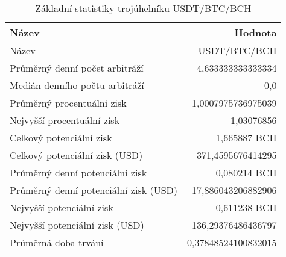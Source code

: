 \begin{table}\centering
\caption{Základní statistiky trojúhelníku USDT/BTC/BCH}
\label{USDTBTCBCH_stats}
\begin{tabular}{|| l | r ||}
\hline Název & Hodnota \\ 
\hline\hline Název & USDT/BTC/BCH \\ 
\hline Průměrný denní počet arbitráží & 4,633333333333334 \\ 
\hline Medián denního počtu arbitráží & 0,0 \\ 
\hline Průměrný procentuální zisk & 1,0007975736975039 \\ 
\hline Nejvyšší procentuální zisk & 1,03076856 \\ 
\hline Celkový potenciální zisk & 1,665887 BCH \\ 
\hline Celkový potenciální zisk (USD) & 371,4595676414295 \\ 
\hline Průměrný denní potenciální zisk & 0,080214 BCH \\ 
\hline Průměrný denní potenciální zisk (USD) & 17,886043206882906 \\ 
\hline Nejvyšší potenciální zisk & 0,611238 BCH \\ 
\hline Nejvyšší potenciální zisk (USD) & 136,29376486436797 \\ 
\hline Průměrná doba trvání & 0,37848524100832015 \\ 
\hline
\end{tabular}
\end{table}